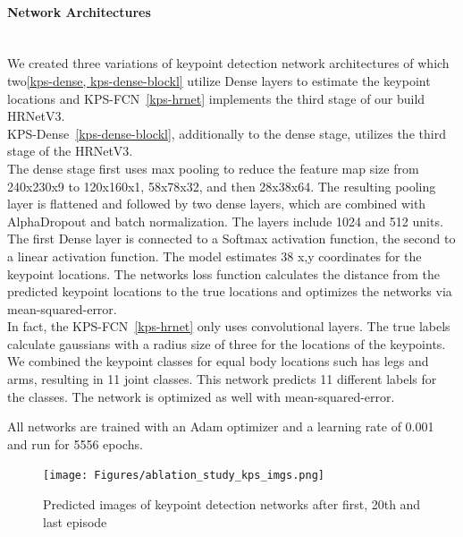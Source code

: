 \paragraph{Network Architectures}\mbox{}\\
We created three variations of keypoint detection network architectures of which two\ref{kps-dense, kps-dense-blockl}
utilize Dense layers to estimate the keypoint locations and KPS-FCN~\ref{kps-hrnet} implements the third stage of our
build HRNetV3.\\
KPS-Dense~\ref{kps-dense-blockl}, additionally to the dense stage, utilizes the third stage of the HRNetV3.\\
The dense stage first uses max pooling to reduce the feature map size from 240x230x9 to 120x160x1, 58x78x32, and then 28x38x64.
The resulting pooling layer is flattened and followed by two dense layers, which are combined with AlphaDropout and
batch normalization.
The layers include 1024 and 512 units.
The first Dense layer is connected to a Softmax activation function,
the second to a linear activation function. The model estimates 38 x,y coordinates for the keypoint locations.
The networks loss function calculates the distance from the predicted keypoint locations to the true locations and optimizes
the networks via mean-squared-error.\\
In fact, the KPS-FCN~\ref{kps-hrnet} only uses convolutional layers.
The true labels calculate gaussians with a radius size of three for the locations of the keypoints.
We combined the keypoint classes for equal body locations such has legs and arms, resulting in 11 joint classes.
This network predicts 11 different labels for the classes. The network is optimized as well with mean-squared-error.

All networks are trained with an Adam optimizer and a learning rate of 0.001 and run for 5556 epochs.

\begin{figure}[H]
    \centering
    \texttt{[image: Figures/ablation\_study\_kps\_imgs.png]}
    \decoRule
    \caption[Ablation Keypoints Detection Module: Predicted Training Images]{Predicted images of keypoint detection networks
    after first, 20th and last episode}
    \label{fig:kps-train-imgs}
\end{figure}

